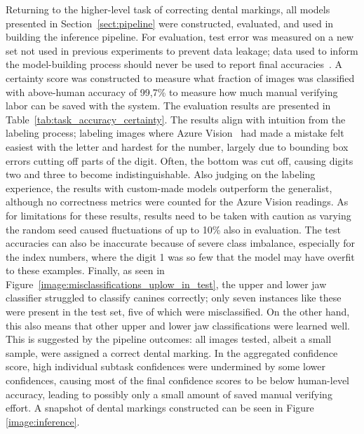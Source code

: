 \documentclass[english,twoside,openright]{UH_DS_MSc}
\begin{document}
Returning to the higher-level task of correcting dental markings, all models presented in Section~\ref{sect:pipeline} were constructed, evaluated, and used 
in building the inference pipeline. For evaluation, test error was measured on a new set not used in previous experiments 
to prevent data leakage; data used to inform the model-building process should never be used to report final accuracies~\cite{engbook}.
A certainty score was constructed to measure what fraction of images was classified with above-human accuracy of 99,7\% to measure 
how much manual verifying labor can be saved with the system. The evaluation results are presented in Table~\ref{tab:task_accuracy_certainty}.
The results align with intuition from the labeling process; labeling images 
where Azure Vision~\cite{azurevision} had made a mistake felt easiest 
with the letter and hardest for the number, largely due to bounding box errors 
cutting off parts of the digit. Often, the bottom was cut off, causing digits two and three to become indistinguishable. Also judging on the labeling experience,
the results with custom-made models outperform the generalist, although no 
correctness metrics were counted for the Azure Vision readings. 
As for limitations for these results, results need to 
be taken with caution as varying the random seed caused fluctuations of 
up to 10\% also in evaluation. The test accuracies can also be inaccurate because 
of severe class imbalance, especially for the index numbers, where the digit 1 was so few
that the model may have overfit to these examples.
Finally, as seen in Figure~\ref{image:misclassifications_uplow_in_test},
the upper and lower jaw classifier struggled to classify canines correctly;
only seven instances like these were present in the test set, five of 
which were misclassified. On the other hand, this also means that other upper 
and lower jaw classifications were learned well. This is suggested by 
the pipeline outcomes: all images tested, albeit a small sample, were 
assigned a correct dental marking. In the aggregated confidence score, 
high individual subtask confidences were undermined by some lower confidences, 
causing most of the final confidence scores to be below human-level accuracy, leading 
to possibly only a small amount of saved manual verifying effort. 
A snapshot of dental markings constructed can be seen in Figure \ref{image:inference}.
\end{document}
